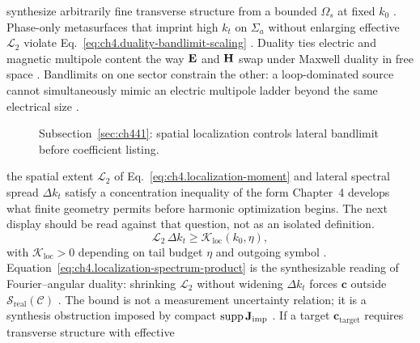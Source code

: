 synthesize arbitrarily fine transverse structure from a bounded \(\Omega_{s}\) at fixed \(k_{0}\)
\cite{jackson1999}. Phase-only metasurfaces that imprint high \(k_{t}\) on \(\Sigma_{a}\) without
enlarging effective \(\mathcal{L}_{2}\) violate Eq.~\eqref{eq:ch4.duality-bandlimit-scaling} \cite{harrington2001}.
Duality ties electric and magnetic multipole content the way $\mathbf{E}$ and $\mathbf{H}$ swap under Maxwell duality in free space \cite{stratton1941}. Bandlimits on one sector constrain the other: a loop-dominated source cannot simultaneously mimic an electric multipole ladder beyond the same electrical size \cite{harrington2001}.
\begin{figure}[t]
\centering
{}
\caption{Subsection~\ref{sec:ch441}: spatial localization controls lateral bandlimit before coefficient listing.}
\label{fig:ch4.spatial-spectral-duality}
\end{figure}
the spatial extent \(\mathcal{L}_{2}\) of Eq.~\eqref{eq:ch4.localization-moment} and lateral spectral spread
\(\Delta k_{t}\) satisfy a concentration inequality of the form
Chapter~4 develops what finite geometry permits before harmonic optimization begins. The next display should be read against that question, not as an isolated definition. \cite{stratton1941}
\begin{equation}
\label{eq:ch4.localization-spectrum-product}
\mathcal{L}_{2}\,\Delta k_{t}
\ge
\mathcal{K}_{\mathrm{loc}}(k_{0},\eta),
\end{equation}
with \(\mathcal{K}_{\mathrm{loc}}>0\) depending on tail budget \(\eta\) and outgoing symbol
\cite{stratton1941}. Equation~\eqref{eq:ch4.localization-spectrum-product} is the synthesizable
reading of Fourier--angular duality: shrinking \(\mathcal{L}_{2}\) without widening \(\Delta k_{t}\) forces
\(\mathbf{c}\) outside \(\mathcal{S}_{\mathrm{real}}(\mathcal{C})\) \cite{devaney2004}. The bound is not a measurement
uncertainty relation; it is a synthesis obstruction imposed by compact \(\operatorname{supp}\mathbf{J}_{\mathrm{imp}}\)
\cite{harrington2001}.
\label{cor:ch4.super-oscillation}
If a target \(\mathbf{c}_{\mathrm{target}}\) requires transverse structure with effective

